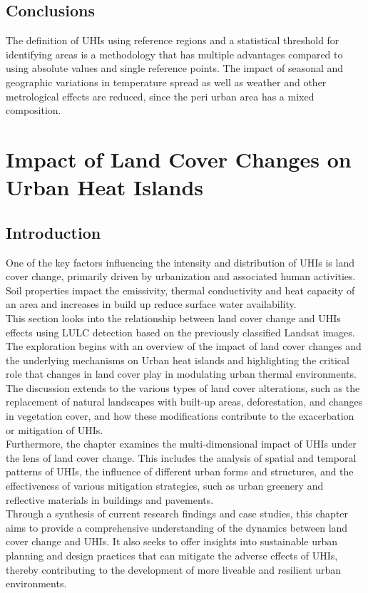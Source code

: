 \documentclass[12pt,a4paper, english]{article}
\begin{document}
    \subsection{Conclusions}
    The definition of \glspl{UHI} using reference regions and a statistical threshold for identifying areas is a methodology that has multiple advantages compared to using absolute values and single reference points. 
    The impact of seasonal and geographic variations in temperature spread as well as weather and other metrological effects are reduced, since the peri urban area has a mixed composition. 

\newpage
\section{Impact of Land Cover Changes on Urban Heat Islands}\label{sec:LULC}
    \subsection{Introduction}
      One of the key factors influencing the intensity and distribution of \glspl{UHI} is land cover change, primarily driven by urbanization and associated human activities.
      Soil properties impact the emissivity, thermal conductivity and heat capacity of an area and increases in build up reduce surface water availability. 
      \\    
      This section looks into the relationship between land cover change and \glspl{UHI} effects using \gls{LULC} detection based on the previously classified Landsat images.
      The exploration begins with an overview of the impact of land cover changes and the underlying mechanisms on Urban heat islands and highlighting the critical role that changes in land cover play in modulating urban thermal environments.
      The discussion extends to the various types of land cover alterations, such as the replacement of natural landscapes with built-up areas, deforestation, and changes in vegetation cover, and how these modifications contribute to the exacerbation or mitigation of \glspl{UHI}.
      \\
      Furthermore, the chapter examines the multi-dimensional impact of \glspl{UHI} under the lens of land cover change.
      This includes the analysis of spatial and temporal patterns of \glspl{UHI}, the influence of different urban forms and structures, and the effectiveness of various mitigation strategies, such as urban greenery and reflective materials in buildings and pavements.
      \\
      Through a synthesis of current research findings and case studies, this chapter aims to provide a comprehensive understanding of the dynamics between land cover change and \glspl{UHI}.
      It also seeks to offer insights into sustainable urban planning and design practices that can mitigate the adverse effects of \glspl{UHI}, thereby contributing to the development of more liveable and resilient urban environments.
%
\end{document}
